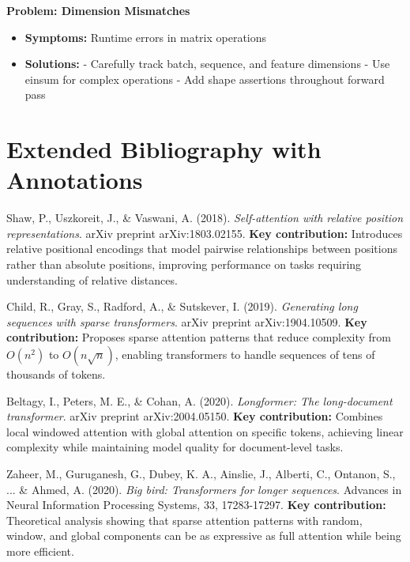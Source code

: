 \documentclass[11pt]{article}
\begin{document}
\textbf{Problem: Dimension Mismatches}
\begin{itemize}
    \item \textbf{Symptoms:} Runtime errors in matrix operations
    \item \textbf{Solutions:}
        - Carefully track batch, sequence, and feature dimensions
        - Use einsum for complex operations
        - Add shape assertions throughout forward pass
\end{itemize}

\section{Extended Bibliography with Annotations}

Shaw, P., Uszkoreit, J., \& Vaswani, A. (2018).
\textit{Self-attention with relative position representations}.
arXiv preprint arXiv:1803.02155.
\textbf{Key contribution:} Introduces relative positional encodings that model pairwise relationships between positions rather than absolute positions, improving performance on tasks requiring understanding of relative distances.

Child, R., Gray, S., Radford, A., \& Sutskever, I. (2019).
\textit{Generating long sequences with sparse transformers}.
arXiv preprint arXiv:1904.10509.
\textbf{Key contribution:} Proposes sparse attention patterns that reduce complexity from $O(n^2)$ to $O(n\sqrt{n})$, enabling transformers to handle sequences of tens of thousands of tokens.

Beltagy, I., Peters, M. E., \& Cohan, A. (2020).
\textit{Longformer: The long-document transformer}.
arXiv preprint arXiv:2004.05150.
\textbf{Key contribution:} Combines local windowed attention with global attention on specific tokens, achieving linear complexity while maintaining model quality for document-level tasks.

Zaheer, M., Guruganesh, G., Dubey, K. A., Ainslie, J., Alberti, C., Ontanon, S., ... \& Ahmed, A. (2020).
\textit{Big bird: Transformers for longer sequences}.
Advances in Neural Information Processing Systems, 33, 17283-17297.
\textbf{Key contribution:} Theoretical analysis showing that sparse attention patterns with random, window, and global components can be as expressive as full attention while being more efficient.
\end{document}
